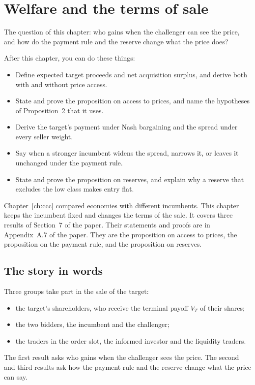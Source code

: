 \chapter{Welfare and the terms of sale}\label{ch:welfare}

\begin{chapterplan}
The question of this chapter: who gains when the challenger can see the price, and how do the payment rule and the
reserve change what the price does?

After this chapter, you can do these things:
\begin{itemize}
\item Define expected target proceeds and net acquisition surplus, and derive both with and without price access.
\item State and prove the proposition on access to prices, and name the hypotheses of Proposition~2 that it uses.
\item Derive the target's payment under Nash bargaining and the spread under every seller weight.
\item Say when a stronger incumbent widens the spread, narrows it, or leaves it unchanged under the payment rule.
\item State and prove the proposition on reserves, and explain why a reserve that excludes the low class makes
entry flat.
\end{itemize}
\end{chapterplan}

Chapter~\ref{ch:ccc} compared economies with different incumbents. This chapter keeps the incumbent fixed and changes
the terms of the sale. It covers three results of Section~7 of the paper. Their statements and proofs are in
Appendix~A.7 of the paper. They are the proposition on access to prices, the proposition on the payment rule, and the
proposition on reserves.

\section{The story in words}\label{sec:welfare-story}

Three groups take part in the sale of the target:
\begin{itemize}
\item the target's shareholders, who receive the terminal payoff \(V_T\) of their shares;
\item the two bidders, the incumbent and the challenger;
\item the traders in the order slot, the informed investor and the liquidity traders.
\end{itemize}
The first result asks who gains when the challenger sees the price. The second and third results ask how the payment
rule and the reserve change what the price can say.

